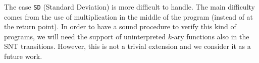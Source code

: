 






The case \texttt{SD} (Standard Deviation) is more difficult to handle. The main difficulty comes from the use of multiplication in the middle of the program (instead of at the return point). In order to have a sound procedure to verify this kind of programs, we will need the support of uninterpreted $k$-ary functions also in the SNT transitions. However, this is not a trivial extension and we consider it as a future work.


